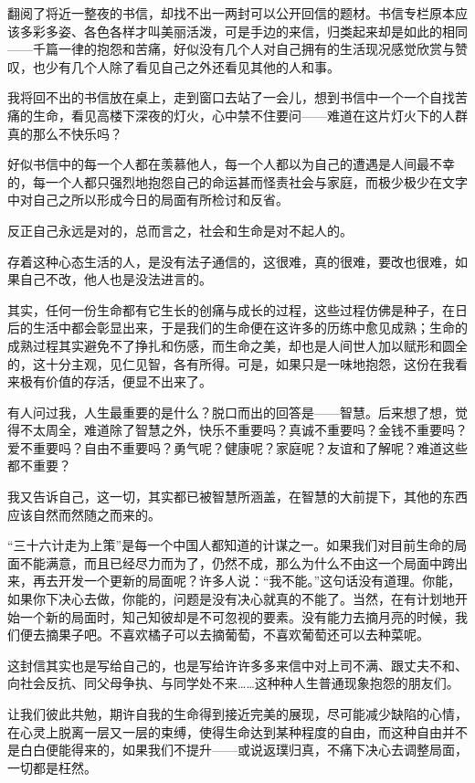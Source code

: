 \par {}
\par 翻阅了将近一整夜的书信，却找不出一两封可以公开回信的题材。书信专栏原本应该多彩多姿、各色各样才叫美丽活泼，可是手边的来信，归类起来却是如此的相同——千篇一律的抱怨和苦痛，好似没有几个人对自己拥有的生活现况感觉欣赏与赞叹，也少有几个人除了看见自己之外还看见其他的人和事。
\par 我将回不出的书信放在桌上，走到窗口去站了一会儿，想到书信中一个一个自找苦痛的生命，看见高楼下深夜的灯火，心中禁不住要问——难道在这片灯火下的人群真的那么不快乐吗？
\par 好似书信中的每一个人都在羡慕他人，每一个人都以为自己的遭遇是人间最不幸的，每一个人都只强烈地抱怨自己的命运甚而怪责社会与家庭，而极少极少在文字中对自己之所以形成今日的局面有所检讨和反省。
\par 反正自己永远是对的，总而言之，社会和生命是对不起人的。
\par 存着这种心态生活的人，是没有法子通信的，这很难，真的很难，要改也很难，如果自己不改，他人也是没法进言的。
\par 其实，任何一份生命都有它生长的创痛与成长的过程，这些过程仿佛是种子，在日后的生活中都会彰显出来，于是我们的生命便在这许多的历练中愈见成熟；生命的成熟过程其实避免不了挣扎和伤感，而生命之美，却也是人间世人加以赋形和圆全的，这十分主观，见仁见智，各有所得。可是，如果只是一味地抱怨，这份在我看来极有价值的存活，便显不出来了。
\par 有人问过我，人生最重要的是什么？脱口而出的回答是——智慧。后来想了想，觉得不太周全，难道除了智慧之外，快乐不重要吗？真诚不重要吗？金钱不重要吗？爱不重要吗？自由不重要吗？勇气呢？健康呢？家庭呢？友谊和了解呢？难道这些都不重要？
\par 我又告诉自己，这一切，其实都已被智慧所涵盖，在智慧的大前提下，其他的东西应该自然而然随之而来的。
\par “三十六计走为上策”是每一个中国人都知道的计谋之一。如果我们对目前生命的局面不能满意，而且已经尽力而为了，仍然不成，那么为什么不由这一个局面中跨出来，再去开发一个更新的局面呢？许多人说：“我不能。”这句话没有道理。你能，如果你下决心去做，你能的，问题是没有决心就真的不能了。当然，在有计划地开始一个新的局面时，知己知彼却是不可忽视的要素。没有能力去摘月亮的时候，我们便去摘果子吧。不喜欢橘子可以去摘葡萄，不喜欢葡萄还可以去种菜呢。
\par 这封信其实也是写给自己的，也是写给许许多多来信中对上司不满、跟丈夫不和、向社会反抗、同父母争执、与同学处不来……这种种人生普通现象抱怨的朋友们。
\par 让我们彼此共勉，期许自我的生命得到接近完美的展现，尽可能减少缺陷的心情，在心灵上脱离一层又一层的束缚，使得生命达到某种程度的自由，而这种自由并不是白白便能得来的，如果我们不提升——或说返璞归真，不痛下决心去调整局面，一切都是枉然。
